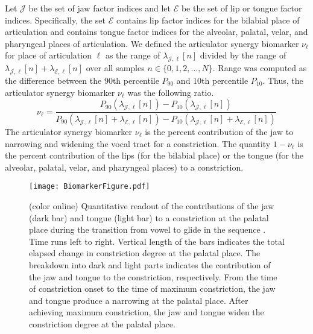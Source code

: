\documentclass[preprint]{JASAnew}\usepackage[]{graphicx}\usepackage[]{color}
\begin{document}
Let $\mathcal{J}$ be the set of jaw factor indices and let $\mathcal{E}$ be the set of lip or tongue factor indices. Specifically, the set $\mathcal{E}$ contains lip factor indices for the bilabial place of articulation and contains tongue factor indices for the alveolar, palatal, velar, and pharyngeal places of articulation. 
%
We defined the articulator synergy biomarker $\nu_\ell$ for place of articulation $\ell$ as the range of $\lambda_{\mathcal{J},\ell} [ n ]$ divided by the range of $\lambda_{\mathcal{J},\ell} [ n ] + \lambda_{\mathcal{E},\ell} [ n ]$
over all samples $n \in \{0, 1, 2, \ldots, N\}$.
%
Range was computed as the difference between the 90th percentile $P_{90}$ and 10th percentile $P_{10}$. 
%
Thus, the articulator synergy biomarker $\nu_\ell$ was the following ratio.
\begin{equation}
\nu_\ell
=
\frac{P_{90}\left( \lambda_{\mathcal{J},\ell} [n] \right) - P_{10}\left( \lambda_{\mathcal{J},\ell} [n] \right)}
{P_{90}\left( \lambda_{\mathcal{J},\ell} [n] + \lambda_{\mathcal{E},\ell} [n] \right) - P_{10}\left( \lambda_{\mathcal{J},\ell} [n] + \lambda_{\mathcal{E},\ell} [n]\right)}
\end{equation}
%
The articulator synergy biomarker $\nu_\ell$ is the percent contribution of the jaw to narrowing and widening the vocal tract for a constriction. 
%
The quantity $1-\nu_\ell$ is the percent contribution of the lips (for the bilabial place) or the tongue (for the alveolar, palatal, velar, and pharyngeal places) to a constriction. 


\begin{figure}

\texttt{[image: BiomarkerFigure.pdf]}

\caption{(color online) Quantitative readout of the contributions of the jaw (dark bar) and tongue (light bar) to a constriction at the palatal place during the transition from vowel \textipa{[a]} to glide \textipa{[j]} in the sequence \textipa{[aja]}. 
%
Time runs left to right.
%
Vertical length of the bars indicates the total elapsed change in constriction degree at the palatal place.
%
The breakdown into dark and light parts indicates the contribution of the jaw and tongue to the constriction, respectively.
%
From the time of constriction onset to the time of maximum constriction, the jaw and tongue produce a narrowing at the palatal place. 
%
After achieving maximum constriction, the jaw and tongue widen the constriction degree at the palatal place.}
\label{fig:biomarkerFigure}%
\end{figure}
\end{document}

